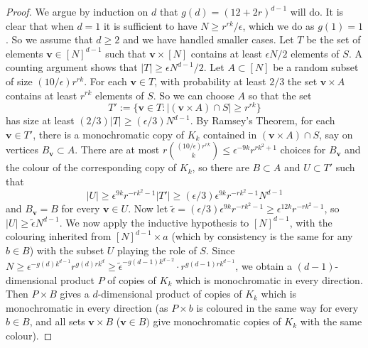 \begin{proof}
We argue by induction on $d$ that $g(d)=(12+2r)^{d-1}$ will do. It is clear that when $d=1$ it is sufficient to have $N\geq r^{rk}/\epsilon$, which we do as $g(1)=1$. So we assume that $d\geq 2$ and we have handled smaller cases. Let $T$ be the set of elements ${\mathbf v}\in[N]^{d-1}$ such that ${\mathbf v}\times[N]$ contains at least $\epsilon N/2$ elements of $S$. A counting argument shows that $|T|\ge \epsilon N^{d-1}/2$.
Let $A\subset[N]$ be a random subset of size $(10/\epsilon)r^{rk}$. For each ${\mathbf v}\in T$, with probability at least $2/3$ the set $\mathbf v\times A$ contains at least $r^{rk}$ elements of $S$. So we can choose $A$ so that the set
    $$T':=\{ {\mathbf v}\in T: |({\mathbf v}\times A)\cap S|\ge r^{rk}\}$$
has size at least $(2/3)|T|\ge(\epsilon/3)N^{d-1}$.
     By Ramsey's Theorem, for each ${\mathbf v}\in T'$, there is a monochromatic copy of $K_k$ contained in 
$({\mathbf v}\times A)\cap S$, 
say on vertices $B_{\mathbf v}\subset A$. There are at most $r\binom{(10/\epsilon)r^{rk}}{k}\leq \epsilon^{-9k}r^{rk^2+1}$ 
     choices for $B_{\mathbf v}$ and the colour of the corresponding copy of $K_k$, so there are $B\subset A$ and $U\subset T'$ such that
$$|U|\ge \epsilon^{9k}r^{-rk^2-1}|T'| \ge (\epsilon/3)\epsilon^{9k}r^{-rk^2-1}N^{d-1}$$
and $B_{\mathbf v}=B$ for every $\mathbf v\in U$.  
Now let $\tilde{\epsilon}=(\epsilon/3)\epsilon^{9k}r^{-rk^2-1}\ge \epsilon^{12k}r^{-rk^2-1}$, so $|U|\geq \tilde{\epsilon}N^{d-1}$. We now apply the inductive hypothesis to $[N]^{d-1}$, with the colouring inherited from $[N]^{d-1}\times a$ (which by consistency is the same for any $b\in B$) with the subset $U$ playing the role of $S$.
Since $N\geq \epsilon^{-g(d)k^{d-1}}r^{g(d)rk^d}
\geq \tilde{\epsilon}^{-g(d-1)k^{d-2}}\cdot r^{g(d-1)rk^{d-1}}$, 
we obtain a $(d-1)$-dimensional product $P$ of copies of $K_k$ which is monochromatic in every direction.  Then $P\times B$ gives a $d$-dimensional product of copies of $K_k$ which is monochromatic in every direction (as $P\times b$ is coloured in the same way for every $b\in B$, and all sets $\textbf{v}\times B$ ($\textbf{v}\in B)$ give monochromatic copies of $K_k$ with the same colour).
\end{proof}


